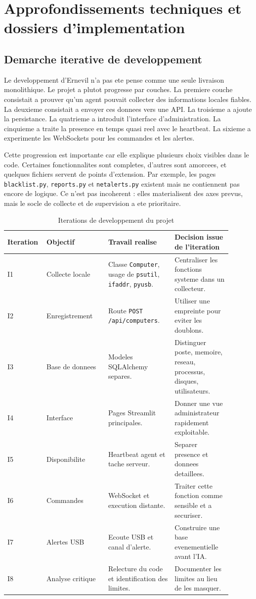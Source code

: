 \documentclass[12pt,a4paper]{report}
\begin{document}
\chapter{Approfondissements techniques et dossiers d'implementation}

\section{Demarche iterative de developpement}
Le developpement d'Ernevil n'a pas ete pense comme une seule livraison monolithique. Le projet a plutot progresse par couches. La premiere couche consistait a prouver qu'un agent pouvait collecter des informations locales fiables. La deuxieme consistait a envoyer ces donnees vers une API. La troisieme a ajoute la persistance. La quatrieme a introduit l'interface d'administration. La cinquieme a traite la presence en temps quasi reel avec le heartbeat. La sixieme a experimente les WebSockets pour les commandes et les alertes.

Cette progression est importante car elle explique plusieurs choix visibles dans le code. Certaines fonctionnalites sont completes, d'autres sont amorcees, et quelques fichiers servent de points d'extension. Par exemple, les pages \texttt{blacklist.py}, \texttt{reports.py} et \texttt{netalerts.py} existent mais ne contiennent pas encore de logique. Ce n'est pas incoherent : elles materialisent des axes prevus, mais le socle de collecte et de supervision a ete prioritaire.

\begin{longtable}{p{0.12\linewidth}p{0.26\linewidth}p{0.28\linewidth}p{0.24\linewidth}}
\caption{Iterations de developpement du projet}\\
\toprule
\textbf{Iteration} & \textbf{Objectif} & \textbf{Travail realise} & \textbf{Decision issue de l'iteration}\\
\midrule
I1 & Collecte locale & Classe \texttt{Computer}, usage de \texttt{psutil}, \texttt{ifaddr}, \texttt{pyusb}. & Centraliser les fonctions systeme dans un collecteur.\\
I2 & Enregistrement & Route \texttt{POST /api/computers}. & Utiliser une empreinte pour eviter les doublons.\\
I3 & Base de donnees & Modeles SQLAlchemy separes. & Distinguer poste, memoire, reseau, processus, disques, utilisateurs.\\
I4 & Interface & Pages Streamlit principales. & Donner une vue administrateur rapidement exploitable.\\
I5 & Disponibilite & Heartbeat agent et tache serveur. & Separer presence et donnees detaillees.\\
I6 & Commandes & WebSocket et execution distante. & Traiter cette fonction comme sensible et a securiser.\\
I7 & Alertes USB & Ecoute USB et canal d'alerte. & Construire une base evenementielle avant l'IA.\\
I8 & Analyse critique & Relecture du code et identification des limites. & Documenter les limites au lieu de les masquer.\\
\bottomrule
\end{longtable}
\end{document}
